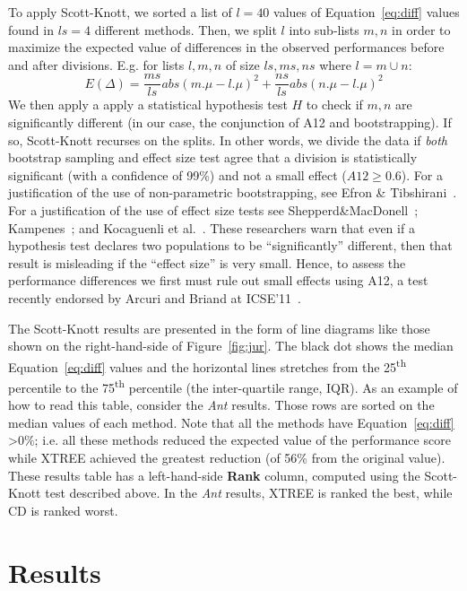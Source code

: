 \documentclass[twocolumn,5p]{elsarticle}
\newcommand{\fig}[1]{Figure~\ref{fig:#1}}
\newcommand{\eq}[1]{Equation~\ref{eq:#1}}
\theoremstyle{break}
\begin{document}
\begin{itemize}
		To  apply Scott-Knott,
		we
		sorted a list of  $l=40$ values of \eq{diff} values found in  $ls=4$ different methods. 
		Then, we split $l$ into sub-lists $m,n$ in order to maximize the expected value of differences in the observed performances before and after divisions. E.g. for lists $l,m,n$ of size $ls,ms,ns$ where $l=m\cup n$: \[E(\Delta)=\frac{ms}{ls}abs(m.\mu - l.\mu)^2 + \frac{ns}{ls}abs(n.\mu - l.\mu)^2\]
		We then apply a apply a statistical hypothesis test $H$ to check
		if $m,n$ are significantly different  (in our case, the conjunction of A12 and bootstrapping). If so, Scott-Knott recurses on the splits. In other words, we divide the data if \textit{both} bootstrap sampling and effect size test agree that a division is statistically significant (with a confidence of 99\%) and not a small effect ($A12 \ge 0.6$).
		For a justification of the use of non-parametric bootstrapping, see Efron \& Tibshirani~\cite[p220-223]{efron93}. For a justification of the use of effect size tests see Shepperd\&MacDonell~\cite{shepperd12a}; Kampenes~\cite{kampenes07}; and Kocaguenli et al.~\cite{Kocaguneli2013:ep}. These researchers warn that even if a hypothesis test declares two populations to be ``significantly'' different, then that result is misleading if the ``effect size'' is very small. Hence, to assess the performance differences we first must rule out small effects using A12, a test   recently endorsed by Arcuri and Briand at ICSE'11~\cite{arcuri11}.
		
		The Scott-Knott  results are presented in the form of line diagrams like those shown on the right-hand-side of \fig{jur}.
		The black dot shows the median \eq{diff} values and the horizontal lines stretches 
		from the 25\textsuperscript{th} percentile to the 75\textsuperscript{th} percentile (the inter-quartile range, IQR). 
		As an example of how to read this table, consider the {\em Ant}
		results. Those rows are  sorted on the median values of each method. Note that all the methods have \eq{diff} \textgreater $ 0\%$; i.e. all these methods reduced the expected value of the performance score while XTREE achieved the greatest reduction (of 56\% from the original value).
		These results table has a  left-hand-side  {\bf Rank} column, computed using the
		Scott-Knott test described above. In the {\em Ant}
		results, XTREE is ranked the best, while CD is  ranked   worst.
		
		
		\section{Results}
		

\end{itemize}
\end{document}
